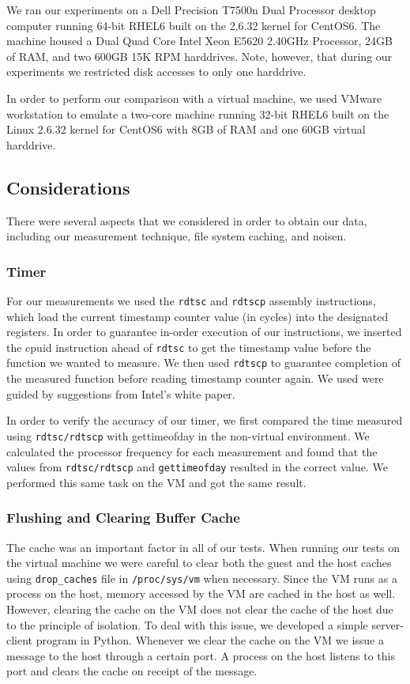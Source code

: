 We ran our experiments on a Dell Precision T7500n Dual Processor desktop 
computer running 64-bit RHEL6 built on the 2.6.32 kernel for CentOS6. The 
machine housed a Dual Quad Core Intel\textsuperscript{\textregistered} 
Xeon\textsuperscript{\textregistered} E5620 2.40GHz Processor, 24GB of RAM, 
and two 600GB 15K RPM harddrives. Note, however, that during our experiments 
we restricted disk accesses to only one harddrive.

In order to perform our comparison with a virtual machine, we used VMware 
workstation to emulate a two-core machine running 32-bit RHEL6 built on the 
Linux 2.6.32 kernel for CentOS6 with 8GB of RAM and one 60GB virtual harddrive.

\subsection{Considerations}
There were several aspects that we considered in order to obtain our data, 
including our measurement technique, file system caching, and noisen.

\subsubsection{Timer}
For our measurements we used the \texttt{rdtsc} and \texttt{rdtscp} assembly instructions, which load 
the current timestamp counter value (in cycles) into the designated registers. In 
order to guarantee in-order execution of our instructions, we inserted the cpuid 
instruction ahead of \texttt{rdtsc} to get the timestamp value before the function we wanted 
to measure. We then used \texttt{rdtscp} to guarantee completion of the measured function 
before reading timestamp counter again. We used were guided by suggestions from Intel's white paper\cite{rdtsc}.

In order to verify the accuracy of our timer, we first compared the time measured 
using \texttt{rdtsc/rdtscp} with gettimeofday in the non-virtual environment. We calculated
the processor frequency for each measurement and found that the values from 
\texttt{rdtsc/rdtscp} and \texttt{gettimeofday} resulted in the correct value. We performed this 
same task on the VM and got the same result.

\subsubsection{Flushing and Clearing Buffer Cache}
The cache was an important factor in all of our tests. When running our tests on the
virtual machine we were careful to clear both the guest and the host caches using 
\texttt{drop\_caches} file in \texttt{/proc/sys/vm} when necessary. Since the VM runs as a process on the host, memory 
accessed by the VM are cached in the host as well. However, clearing the cache on the VM 
does not clear the cache of the host due to the principle of isolation. To deal with this
issue, we developed a simple server-client program in Python. Whenever we clear the cache on the VM
 we issue a message to the host through a certain port. A process on the host listens to this port and clears the cache on
receipt of the message.

